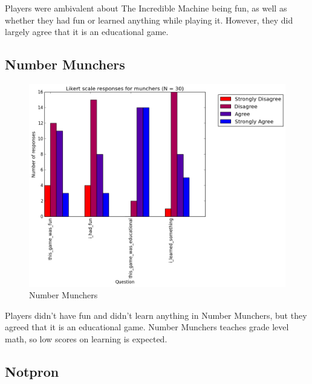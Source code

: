 				Players were ambivalent about The Incredible Machine being fun, as well as whether they had fun or learned anything while playing it. However, they did largely agree that it is an educational game.

			\subsection{Number Munchers}

				\begin{figure}[] 
				\centering 
				\includegraphics[width=\textwidth, height=.4\textheight, keepaspectratio=true]{munchers_likert.png} 
				\caption{Number Munchers}
				\end{figure}

				Players didn't have fun and didn't learn anything in Number Munchers, but they agreed that it is an educational game. Number Munchers teaches grade level math, so low scores on learning is expected.

			\subsection{Notpron}

